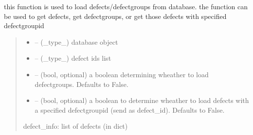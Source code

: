 \documentclass[letterpaper,10pt,english]{sphinxmanual}
\begin{document}
\begin{savenotes}\begin{fulllineitems}
\label{\detokenize{setting/backend/defect_management_funcs:oxin.backend.defect_management_funcs.load_defects_from_db}}
\pysigstartsignatures
{}
\pysigstopsignatures
\sphinxAtStartPar
this function is used to load defects/defect\sphinxhyphen{}groups from database.
the function can be used to get defects, get defect\sphinxhyphen{}groups, or get those defects with specified defect\sphinxhyphen{}group\sphinxhyphen{}id
\begin{quote}\begin{description}
\begin{itemize}
\item {} 
\sphinxAtStartPar
{} – (\_type\_) database object

\item {} 
\sphinxAtStartPar
{} – (\_type\_) defect ids list

\item {} 
\sphinxAtStartPar
{} – (bool, optional) a boolean determining wheather to load defect\sphinxhyphen{}groups. Defaults to False.

\item {} 
\sphinxAtStartPar
{} – (bool, optional) a boolean to determine wheather to load defects with a specified defect\sphinxhyphen{}group\sphinxhyphen{}id (send as defect\_id). Defaults to False.

\end{itemize}

\sphinxAtStartPar
defect\_info: list of defects (in dict)

\end{description}\end{quote}

\end{fulllineitems}\end{savenotes}
\end{document}
